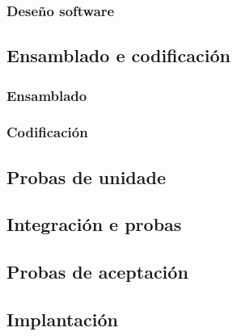   \subsubsection{Deseño software}

 \subsection{Ensamblado e codificación}

  \subsubsection{Ensamblado}

  \subsubsection{Codificación}

 \subsection{Probas de unidade}

 \subsection{Integración e probas}

 \subsection{Probas de aceptación}

 \subsection{Implantación}
